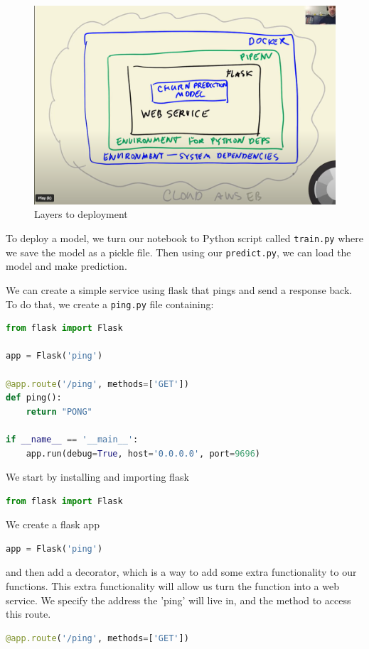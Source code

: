 \documentclass[letterpaper,12pt,notitlepage,twoside]{report}
\begin{document}
\begin{figure}[h]
	\centering
	\includegraphics[width=\textwidth]{Images/layers-to-deployment.png}
	\caption{Layers to deployment}
	\label{fig:8}
\end{figure}
\FloatBarrier

To deploy a model, we turn our notebook to Python script called \texttt{train.py} where we save the model as a pickle file. Then using our \texttt{predict.py}, we can load the model and make prediction. 

We can create a simple service using flask that pings and send a response back. To do that, we create a \texttt{ping.py} file containing:

\begin{lstlisting}[language=python, numbers=none]
from flask import Flask

app = Flask('ping')

@app.route('/ping', methods=['GET'])
def ping():
    return "PONG"

if __name__ == '__main__':
    app.run(debug=True, host='0.0.0.0', port=9696)
\end{lstlisting}

We start by installing and importing flask
\begin{lstlisting}[language=python, numbers=none]
from flask import Flask
\end{lstlisting}

We create a flask app
\begin{lstlisting}[language=python, numbers=none]
app = Flask('ping')
\end{lstlisting}

and then add a decorator, which is a way to add some extra functionality to our functions. This extra functionality will allow us turn the function into a web service. We specify the address the 'ping' will live in, and the method to access this route. 
\begin{lstlisting}[language=python, numbers=none]
@app.route('/ping', methods=['GET'])
\end{lstlisting}
\end{document}
